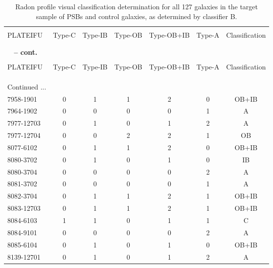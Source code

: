 

\begin{longtable}[c]{lcccccc}
\caption[Radon profile visual classification of PSBs and controls - classifier B]{Radon profile visual classification determination for all 127 galaxies in the target sample of PSBs and control galaxies, as determined by classifier B.}



\label{tab:visual-classification-B}\\
\hline
\\
PLATEIFU & Type-C & Type-IB & Type-OB & Type-OB+IB & Type-A & Classification \\
\\
\hline
\\
\endfirsthead
{{\bfseries \tablename\ \thetable{} -- cont.}}
\\
\hline
\\
PLATEIFU & Type-C & Type-IB & Type-OB & Type-OB+IB & Type-A & Classification \\
\\
\hline
\\
\endhead
%
\\
\hline 
{{Continued ...}}
\endfoot
\\
\hline
\endlastfoot
%
7958-1901 & 0 & 1 & 1 & 2 & 0 & OB+IB \\
7964-1902 & 0 & 0 & 0 & 0 & 1 & A \\
7977-12703 & 0 & 1 & 0 & 1 & 2 & A \\
7977-12704 & 0 & 0 & 2 & 2 & 1 & OB \\
8077-6102 & 0 & 1 & 1 & 2 & 0 & OB+IB \\
8080-3702 & 0 & 1 & 0 & 1 & 0 & IB \\
8080-3704 & 0 & 0 & 0 & 0 & 2 & A \\
8081-3702 & 0 & 0 & 0 & 0 & 1 & A \\
8082-3704 & 0 & 1 & 1 & 2 & 1 & OB+IB \\
8083-12703 & 0 & 1 & 1 & 2 & 1 & OB+IB \\
8084-6103 & 1 & 1 & 0 & 1 & 1 & C \\
8084-9101 & 0 & 0 & 0 & 0 & 2 & A \\
8085-6104 & 0 & 1 & 0 & 1 & 0 & OB+IB \\
8139-12701 & 0 & 1 & 0 & 1 & 2 & A \\

\end{longtable}
